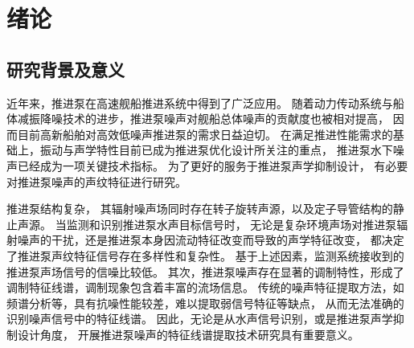 \chapter{绪论}

\section{研究背景及意义}
近年来，推进泵在高速舰船推进系统中得到了广泛应用\cite{carltonMarinePropellersPropulsion2018}。
随着动力传动系统与船体减振降噪技术的进步，推进泵噪声对舰船总体噪声的贡献度也被相对提高，
因而目前高新船舶对高效低噪声推进泵的需求日益迫切\cite{ozdenUnderwaterRadiatedNoise2016}。
在满足推进性能需求的基础上，振动与声学特性目前已成为推进泵优化设计所关注的重点，
推进泵水下噪声已经成为一项关键技术指标。
为了更好的服务于推进泵声学抑制设计，
有必要对推进泵噪声的声纹特征进行研究。

\begin{comment}
推进泵噪声机理较为复杂，抛开空化噪声不谈仅从流致噪声角度考虑，其频谱已呈现宽带与线谱交叠的形貌。
推进泵内非定常流动与水力部件相互作用产生的流致激励是重要的噪声激励源，
推进泵噪声信号中蕴含着丰富的流致激励源信息，流致激励源特征能反映推进泵的运行状态和结构信息。
当推进泵内流动发生显著改变时，其噪声信号的低频声纹理特性也会发生变化。
无论是从特征声源信号识别，或是发展噪声能量主动控制技术角度，
构建推进泵流致激励源识别的有效方法，建立流致激励源特征与噪声信号之间的联系都尤为重要。
\end{comment}

推进泵结构复杂，
其辐射噪声场同时存在转子旋转声源，以及定子导管结构的静止声源。
当监测和识别推进泵水声目标信号时，
无论是复杂环境声场对推进泵辐射噪声的干扰，还是推进泵本身因流动特征改变而导致的声学特征改变，
都决定了推进泵声纹特征信号存在多样性和复杂性\cite{__2016杨琼方}。
基于上述因素，监测系统接收到的推进泵声场信号的信噪比较低。
其次，推进泵噪声存在显著的调制特性，形成了调制特征线谱，调制现象包含着丰富的流场信息。
传统的噪声特征提取方法，如频谱分析等，具有抗噪性能较差，难以提取弱信号特征等缺点，
从而无法准确的识别噪声信号中的特征线谱。
因此，无论是从水声信号识别，或是推进泵声学抑制设计角度，
开展推进泵噪声的特征线谱提取技术研究具有重要意义。

\begin{comment}
传统的频谱分析方法已经无法准确的对流致激励特征声源进行识别，以及对推进泵的运行状态进行表征。
其噪声信号中存在复杂的干扰因素：其一，推进泵处在复杂的背景环境声场中，
动力系统等辅助结构产生的辐射噪声也给目标声源信号带来了很大干扰，影响
测试系统对推进泵目标真实辐射噪声信号的监测；其二，推进泵结构复杂，
推进泵辐射噪声场同时存在转子旋转声源，以及定子导管结构的静止声源，
其辐射噪声具有分量复杂性。基于上述因素，监测系统接收到的目标声场信号的信噪比较低。特征信
号如流致激励源特征频率、轴频等与其他背景噪声相比均较为微弱，
给基于传统噪声特征提取方法带来了困难，难以准确的识别噪声信号的流致激励源特征。
其次，推进泵噪声存在显著的调制特性，调制现象包含着丰富的流场信息，
但是传统的频谱分析及解调方法无法实现高精度低频调制特征的提取。
因此，开展低信噪比工况下的推进泵噪声信号的低频特征提取技术研究
有重要的理论和工程意义。
\end{comment}

